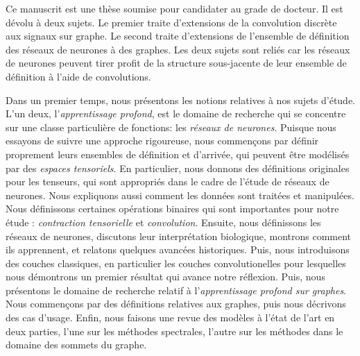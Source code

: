 Ce manuscrit est une thèse soumise pour candidater au grade de docteur. Il est dévolu à deux sujets. Le premier traite d'extensions de la convolution discrète aux signaux sur graphe. Le second traite d'extensions de l'ensemble de définition des réseaux de neurones à des graphes. Les deux sujets sont reliés car les réseaux de neurones peuvent tirer profit de la structure sous-jacente de leur ensemble de définition à l'aide de convolutions.

Dans un premier temps, nous présentons les notions relatives à nos sujets d'étude. L'un deux, l'\emph{apprentissage profond}, est le domaine de recherche qui se concentre sur une classe particulière de fonctions: les \emph{réseaux de neurones}. Puisque nous essayons de suivre une approche rigoureuse, nous commençons par définir proprement leurs ensembles de définition et d'arrivée, qui peuvent être modélisés par des \emph{espaces tensoriels}. En particulier, nous donnons des définitions originales pour les tenseurs, qui sont appropriés dans le cadre de l'étude de réseaux de neurones. Nous expliquons aussi comment les données sont traitées et manipulées. Nous définissons certaines opérations binaires qui sont importantes pour notre étude : \emph{contraction tensorielle} et \emph{convolution}. Ensuite, nous définissons les réseaux de neurones, discutons leur interprétation biologique, montrons comment ils apprennent, et relatons quelques avancées historiques. Puis, nous introduisons des couches classiques, en particulier les couches convolutionelles pour lesquelles nous démontrons un premier résultat qui avance notre réflexion. Puis, nous présentons le domaine de recherche relatif à l'\emph{apprentissage profond sur graphes}. Nous commençons par des définitions relatives aux graphes, puis nous décrivons des cas d'usage. Enfin, nous faisons une revue des modèles à l'état de l'art en deux parties, l'une sur les méthodes spectrales, l'autre sur les méthodes dans le domaine des sommets du graphe.


